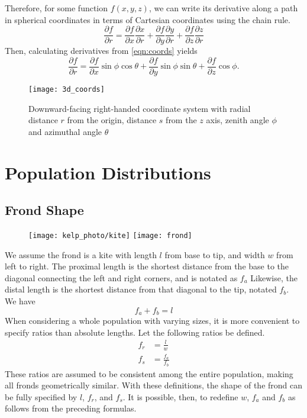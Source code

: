 Therefore, for some function $f(x,y,z)$, we can write its derivative along a path in spherical coordinates in terms of Cartesian coordinates using the chain rule.
\begin{equation}
	\frac{\partial f}{\partial r} 
	=\frac{\partial f}{\partial x}\frac{\partial x}{\partial r} 
	+ \frac{\partial f}{\partial y}\frac{\partial y}{\partial r} 
	+ \frac{\partial f}{\partial z}\frac{\partial z}{\partial r}
\end{equation}
Then, calculating derivatives from \eqref{eqn:coords} yields
\begin{equation}
	\frac{\partial f}{\partial r} 
	=\frac{\partial f}{\partial x}\sin\phi\cos\theta
	+ \frac{\partial f}{\partial y}\sin\phi\sin\theta
	+ \frac{\partial f}{\partial z}\cos\phi.
	\label{eqn:partials}
\end{equation}
\begin{figure}[H]
	\centering
	\texttt{[image: 3d\_coords]}
	\caption{Downward-facing right-handed coordinate system with radial distance $r$ from the origin, distance $s$ from the $z$ axis, zenith angle $\phi$ and azimuthal angle $\theta$}
	\label{fig:3dcoords}
\end{figure}


\section{Population Distributions}

\subsection{Frond Shape}
\label{sec:shape}

\begin{figure}[h]
	\centering
  \texttt{[image: kelp\_photo/kite]}
  \qquad
	\texttt{[image: frond]}
	\label{fig:frond}
\end{figure}

We assume the frond is a kite with length $l$ from base to tip, and width $w$ from left to right.
The proximal length is the shortest distance from the base to the diagonal connecting the left and right corners, and is notated as $f_a$
Likewise, the distal length is the shortest distance from that diagonal to the tip, notated $f_b$.
 We have
 \begin{equation}
	 f_a + f_b = l
 \end{equation}
When considering a whole population with varying sizes, it is more convenient to specify ratios than absolute lengths.
Let the following ratios be defined.
\begin{align}
	f_r &= \frac{l}{w} \\
	f_s &= \frac{f_a}{f_b}
\end{align}
These ratios are assumed to be consistent among the entire population, making all fronds geometrically similar.
With these definitions, the shape of the frond can be fully specified by $l$, $f_r$, and $f_s$.
It is possible, then, to redefine $w$, $f_a$ and $f_b$ as follows from the preceding formulas.

